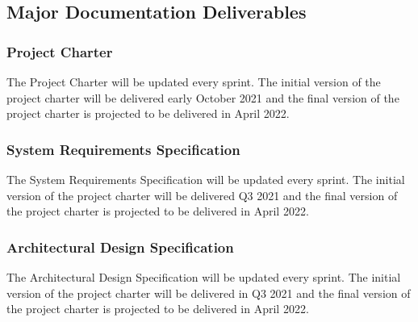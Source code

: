 
\subsection{Major Documentation Deliverables}

\subsubsection{Project Charter}
The Project Charter will be updated every sprint. The initial version of the project charter will be delivered early October 2021 and the final version of the project charter is projected to be delivered in April 2022.

\subsubsection{System Requirements Specification}
The System Requirements Specification will be updated every sprint. The initial version of the project charter will be delivered Q3 2021 and the final version of the project charter is projected to be delivered in April 2022.

\subsubsection{Architectural Design Specification}
The Architectural Design Specification will be updated every sprint. The initial version of the project charter will be delivered in Q3 2021 and the final version of the project charter is projected to be delivered in April 2022.

